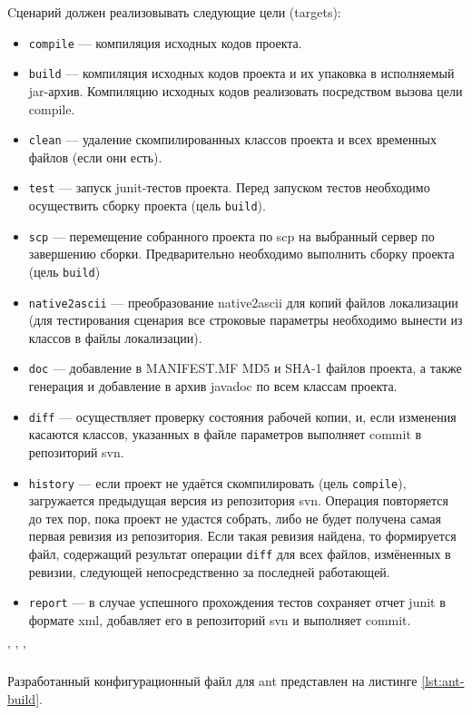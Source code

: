 Cценарий должен реализовывать следующие цели (targets):
\begin{itemize}
    \item \verb|compile| --- компиляция исходных кодов проекта.
    \item \verb|build| --- компиляция исходных кодов проекта и их упаковка в исполняемый jar-архив. Компиляцию исходных кодов реализовать посредством вызова цели compile.
    \item \verb|clean| --- удаление скомпилированных классов проекта и всех временных файлов (если они есть).
    \item \verb|test| --- запуск junit-тестов проекта. Перед запуском тестов необходимо осуществить сборку проекта (цель \verb|build|).
    \item \verb|scp| --- перемещение собранного проекта по scp на выбранный сервер по завершению сборки. Предварительно необходимо выполнить сборку проекта (цель \verb|build|)
    \item \verb|native2ascii| --- преобразование native2ascii для копий файлов локализации (для тестирования сценария все строковые параметры необходимо вынести из классов в файлы локализации).
    \item \verb|doc| --- добавление в MANIFEST.MF MD5 и SHA-1 файлов проекта, а также генерация и добавление в архив javadoc по всем классам проекта.
    \item \verb|diff| --- осуществляет проверку состояния рабочей копии, и, если изменения касаются классов, указанных в файле параметров выполняет commit в репозиторий svn.
    \item \verb|history| --- если проект не удаётся скомпилировать (цель \verb|compile|), загружается предыдущая версия из репозитория svn. Операция повторяется до тех пор, пока проект не удастся собрать, либо не будет получена самая первая ревизия из репозитория. Если такая ревизия найдена, то формируется файл, содержащий результат операции \verb|diff| для всех файлов, измёненных в ревизии, следующей непосредственно за последней работающей.
    \item \verb|report| --- в случае успешного прохождения тестов сохраняет отчет junit в формате xml, добавляет его в репозиторий svn и выполняет commit.
\end{itemize}
\begin{center}
' ' '
\end{center}


Разработанный конфигурационный файл для ant представлен на листинге \ref{lst:ant-build}.

